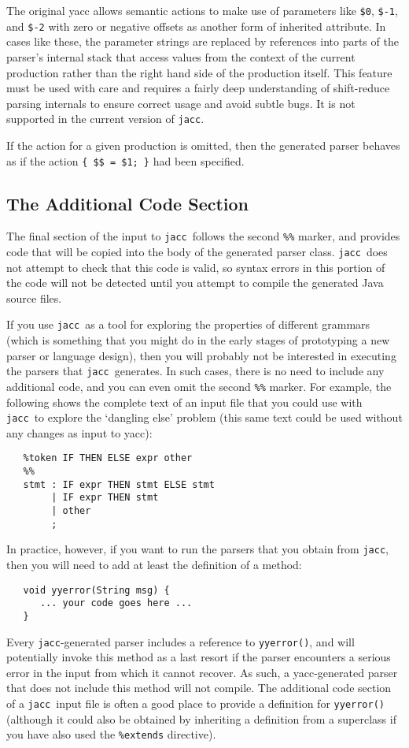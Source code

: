 \documentclass[12pt]{article}
\def\jacc{{\tt jacc}}
\begin{document}
The original yacc allows semantic actions to make use of
parameters like \verb"$0", \verb"$-1", and \verb"$-2" with zero
or negative offsets as another form of inherited attribute.
In cases like these, the parameter strings are replaced by
references into parts of the parser's internal stack that
access values from the context of the current production
rather than the right hand side of the production itself.
This feature must be used with care and requires a fairly
deep understanding of shift-reduce parsing internals to
ensure correct usage and avoid subtle bugs.  It is not
supported in the current version of \jacc.

If the action for a given production is omitted, then the
generated parser behaves as if the action \verb"{ $$ = $1; }" had
been specified.
\def\ignoreMeThisIsForSyntaxColoringOnly{\verb"$$"}

\subsection{The Additional Code Section}
The final section of the input to \jacc\ follows the second
\verb"%%" marker, and provides code that will be copied into
the body of the generated parser class.  \jacc\ does not attempt
to check that this code is valid, so syntax errors in this portion
of the code will not be detected until you attempt to compile the
generated Java source files.

If you use \jacc\ as a tool for exploring the properties of different
grammars (which is something that you might do in the early stages of
prototyping a new parser or language design), then you will probably
not be interested in executing the parsers that \jacc\ generates.
In such cases, there is no need to include any additional code, and
you can even omit the second \verb"%%" marker.  For example, the
following shows the complete text of an input file that you could
use with \jacc\ to explore the `dangling else' problem (this same
text could be used without any changes as input to yacc):
\begin{verbatim}
   %token IF THEN ELSE expr other
   %%
   stmt : IF expr THEN stmt ELSE stmt
        | IF expr THEN stmt
        | other
        ;
\end{verbatim}

In practice, however, if you want to run the parsers
that you obtain from \jacc, then you will need to add at least
the definition of a method:
\begin{verbatim}
   void yyerror(String msg) {
      ... your code goes here ...
   }
\end{verbatim}
Every \jacc-generated parser includes a reference to \verb"yyerror()",
and will potentially invoke this method as a last resort if the parser
encounters a serious error in the input from which it cannot recover.
As such, a yacc-generated parser that does not include this method
will not compile.  The additional code section of a \jacc\ input
file is often a good place to provide a definition for \verb"yyerror()"
(although it could also be obtained by inheriting a definition from a
superclass if you have also used the \verb"%extends" directive).
\end{document}
